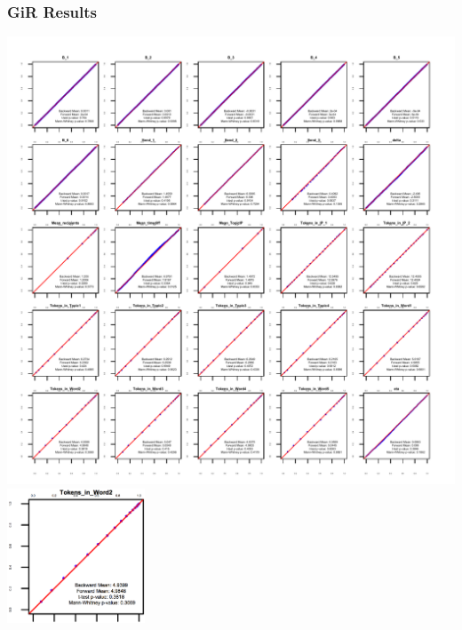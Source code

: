 \documentclass[10pt, xcolor=table]{beamer}
\theoremstyle{definition}
\theoremstyle{remark}
\newenvironment{changemargin}[2]{%
  \begin{list}{}{%
    \setlength{\topsep}{0pt}%
    \setlength{\leftmargin}{#1}%
    \setlength{\rightmargin}{#2}%
    \setlength{\listparindent}{\parindent}%
    \setlength{\itemindent}{\parindent}%
    \setlength{\parsep}{\parskip}%
  }%
  \item[]}{\end{list}}
\begin{document}
\begin{frame} \frametitle{GiR Results}
\begin{changemargin}{-1cm}{-.5cm}
\vspace{-1.5cm}
\includegraphics[scale=.45, left]{./figures/GiReta} \\  \vspace{-6cm} \includegraphics[height=4cm, right]{./figures/GiRFocus}
\end{changemargin}
\end{frame}
\end{document}
